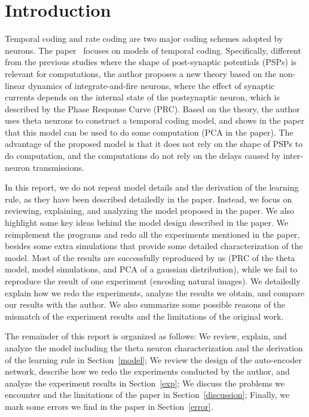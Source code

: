 \section{Introduction}
\label{intro}

Temporal coding and rate coding are two major coding schemes adopted by neurons.
The paper~\cite{voe2007temporal} focuses on models of temporal coding. Specifically,
different from the previous studies where the shape of post-synaptic potentials (PSPs) is relevant for computations,
the author proposes a new theory based on the non-linear dynamics of integrate-and-fire neurons,
where the effect of synaptic currents depends on the internal state of the postsynaptic neuron, 
which is described by the Phase Response Curve (PRC). 
Based on the theory, the author uses theta neurons to construct a temporal coding model,
and shows in the paper that this model can be used to do some computation (PCA in the paper).
The advantage of the proposed model is that it does not rely on the shape of PSPs to do computation,
and the computations do not rely on the delays caused by inter-neuron transmissions.

In this report, we do not repeat model details and the derivation of the learning rule, as they have been described
detailedly in the paper. 
Instead, we focus on reviewing, explaining, and analyzing the model proposed in the paper.
We also highlight some key ideas behind the model design described in the paper.
We reimplement the programs and redo all the experiments mentioned in the paper,
besides some extra simulations that provide some detailed characterization of the model.
Most of the results are successfully reproduced by us (PRC of the theta model, model simulations, and PCA of a gaussian distribution), while we fail to reproduce the result of one experiment (encoding natural images).
We detailedly explain how we redo the experiments, analyze the results we obtain, and compare our results with
the author.
We also summarize some possible reasons of the mismatch of the experiment results and the limitations of the original work.

The remainder of this report is organized as follows:
We review, explain, and analyze the model including the theta neuron characterization and the derivation of the learning rule in Section~\ref{model}; 
We review the design of the auto-encoder network, describe how we redo the experiments conducted by the author,
and analyze the experiment results in Section~\ref{exp};
We discuss the problems we encounter and the limitations of the paper in Section~\ref{discussion};
Finally, we mark some errors we find in the paper in Section~\ref{error}.
